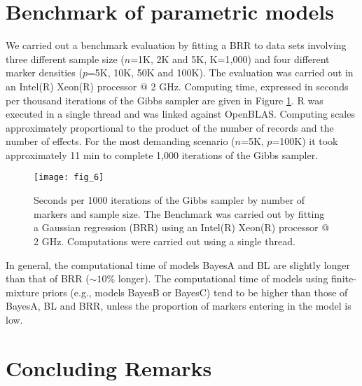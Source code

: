 \documentclass[article,shortnames,nojss]{jss}
\begin{document}
\section{Benchmark of parametric models}
\label{sec:benchmark}

We carried out a benchmark evaluation by fitting a BRR to data sets involving 
three different sample size ($n$=1K, 2K and 5K, K=1,000) and 
four different marker densities ($p$=5K, 10K, 50K and 100K). The 
evaluation was carried out in an Intel(R) Xeon(R) processor @ 2 GHz. 
Computing time, expressed in seconds per thousand 
iterations of the Gibbs sampler are given in Figure \ref{fig:benchmark}. 
R was executed in a single thread and was linked against 
OpenBLAS. Computing scales approximately proportional to the product of the number 
of records and the number of effects. For the 
most demanding scenario ($n$=5K, $p$=100K) it took 
approximately 11 min to complete 1,000 iterations 
of the Gibbs sampler.

\begin{figure}[!htb]
  \centering
  \texttt{[image: fig\_6]}
  \caption{Seconds per 1000 iterations of the Gibbs sampler by number of %
           markers and sample size. The Benchmark was carried out %
           by fitting a Gaussian regression (BRR) using an Intel(R) Xeon(R) %
           processor @ 2 GHz. Computations were carried out using a single thread.}
  \label{fig:benchmark}
\end{figure} 

In general, the computational time of models BayesA and BL  
are slightly longer than that of BRR ($\sim 10\%$ longer). The computational 
time of models using finite-mixture priors (e.g., models BayesB or BayesC) tend to 
be higher than those of BayesA, BL and BRR, unless the proportion of markers 
entering in the model is low.

\vspace{2cm}
\section{Concluding Remarks}
\label{sec:concluding}
\end{document}
